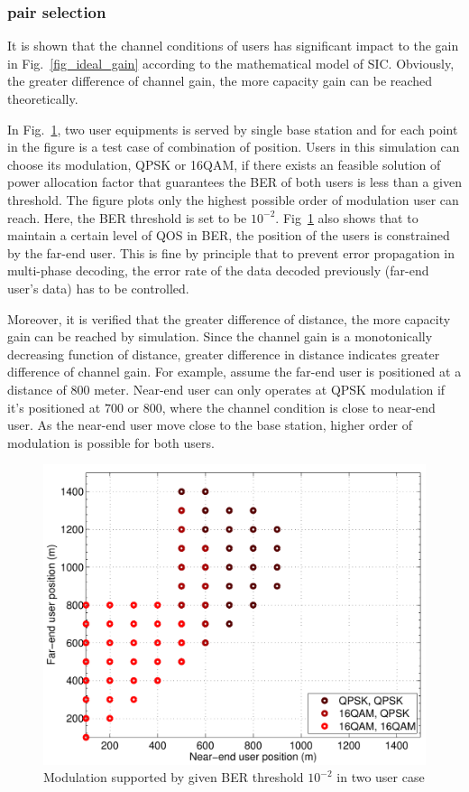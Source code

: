 \subsubsection{pair selection}
\label{pair_selection}
It is shown that the channel conditions of users has significant impact to 
the gain in Fig.~\ref{fig_ideal_gain} according to the mathematical model 
of SIC. 
Obviously, the greater difference of channel gain, the more capacity gain 
can be reached theoretically.

In Fig.~\ref{fig_sim_modVSpos}, two user equipments is served by single 
base station and for each point in the figure is a test case of combination
of position.
Users in this simulation can choose its modulation, QPSK or 16QAM, if there
exists an feasible solution of power allocation factor that guarantees the
BER of both users is less than a given threshold.
The figure plots only the highest possible order of modulation user can reach.
Here, the BER threshold is set to be $10^{-2}$.
Fig~\ref{fig_sim_modVSpos} also shows that to maintain a certain level of
QOS in BER, the position of the users is constrained by the far-end user.
This is fine by principle that to prevent error propagation in multi-phase
decoding, the error rate of the data decoded previously (far-end user's data)
has to be controlled.

Moreover, it is verified that the greater difference of distance, the more 
capacity gain can be reached by simulation.
Since the channel gain is a monotonically decreasing function of distance,
greater difference in distance indicates greater difference of channel gain.
For example, assume the far-end user is positioned at a distance of $800$ meter.
Near-end user can only operates at QPSK modulation if it's positioned at
$700$ or $800$, where the channel condition is close to near-end user.
As the near-end user move close to the base station, higher order of modulation
is possible for both users.

\begin{figure}[t]
\begin{center}
\includegraphics[width=0.95\columnwidth ,angle=0]{figure/positionVSmod.pdf}
\caption{Modulation supported by given BER threshold $10^{-2}$ in two user case}
\label{fig_sim_modVSpos}
\end{center}
\end{figure}

